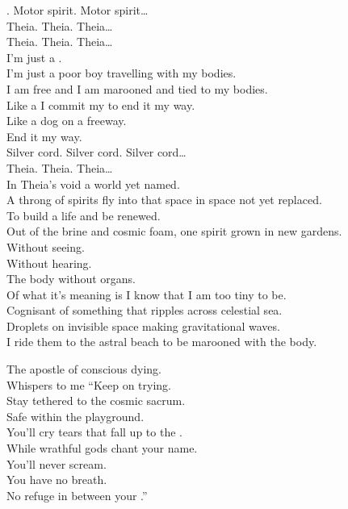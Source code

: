 
. Motor spirit. Motor spirit… \\

Theia. Theia. Theia… \\

Theia. Theia. Theia… \\

I'm just a . \\
I'm just a poor boy travelling with my bodies. \\
I am free and I am marooned and tied to my bodies. \\

Like a  I commit my  to end it my way. \\
Like a dog on a freeway. \\
End it my way. \\

Silver cord. Silver cord. Silver cord… \\

Theia. Theia. Theia… \\

In Theia's void a world yet named. \\
A throng of spirits fly into that space in space not yet replaced. \\
To build a life and be renewed. \\
Out of the brine and cosmic foam, one spirit grown in new gardens. \\
Without seeing. \\
Without hearing. \\
The body without organs. \\

Of what it's meaning is I know that I am too tiny to be. \\
Cognisant of something that ripples across celestial sea. \\
Droplets on invisible space making gravitational waves. \\
I ride them to the astral beach to be marooned with the body. \\



The apostle of conscious dying. \\
Whispers to me ``Keep on trying. \\
Stay tethered to the cosmic sacrum. \\
Safe within the  playground. \\
You'll cry tears that fall up to the . \\
While wrathful gods chant your name. \\
You'll never scream. \\
You have no breath. \\
No refuge in between your .'' \\

